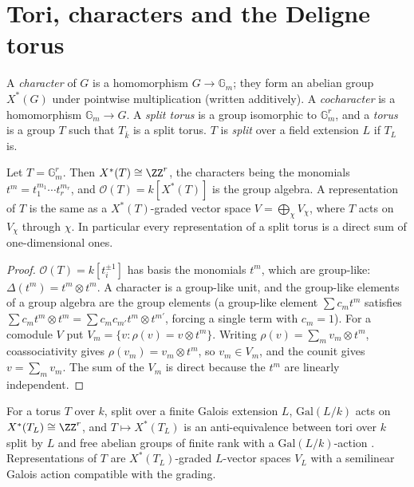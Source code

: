 \section{Tori, characters and the Deligne torus}\label{algebraic-groups:section-tori}

\begin{definition}\label{algebraic-groups:definition-torus}
A \emph{character} of $G$ is a homomorphism $G \to \mathbb{G}_m$; they form an abelian group $X^*(G)$ under pointwise multiplication (written additively). A
\emph{cocharacter} is a homomorphism $\mathbb{G}_m \to G$. A \emph{split torus} is a group isomorphic to $\mathbb{G}_m^r$, and a \emph{torus} is a group $T$ such that $T_{\bar k}$ is a split
torus. $T$ is \emph{split} over a field extension $L$ if $T_L$ is.
\end{definition}

\begin{proposition}\label{algebraic-groups:proposition-torus-reps}
Let $T = \mathbb{G}_m^r$. Then $X^*(T) \cong \ZZ^r$, the characters being the monomials $t^m = t_1^{m_1} \cdots t_r^{m_r}$, and $\mathcal{O}(T) = k[X^*(T)]$ is the group algebra. A
representation of $T$ is the same as a $X^*(T)$-graded vector space $V = \bigoplus_\chi V_\chi$, where $T$ acts on $V_\chi$ through $\chi$. In particular every representation of a
split torus is a direct sum of one-dimensional ones.
\end{proposition}

\begin{proof}
$\mathcal{O}(T) = k[t_i^{\pm 1}]$ has basis the monomials $t^m$, which are group-like: $\Delta(t^m) = t^m \otimes t^m$. A character is a group-like unit, and the group-like elements of a
group algebra are the group elements (a group-like element $\sum c_mt^m$ satisfies $\sum c_mt^m \otimes t^m = \sum c_mc_{m'}t^m \otimes t^{m'}$, forcing a single term with $c_m = 1$). For a
comodule $V$ put $V_m = \{v : \rho(v) = v \otimes t^m\}$. Writing $\rho(v) = \sum_mv_m \otimes t^m$, coassociativity gives $\rho(v_m) = v_m \otimes t^m$, so $v_m \in V_m$, and the counit gives
$v = \sum_mv_m$. The sum of the $V_m$ is direct because the $t^m$ are linearly independent.
\end{proof}

\begin{remark}\label{algebraic-groups:remark-galois-tori}
For a torus $T$ over $k$, split over a finite Galois extension $L$, $\mathrm{Gal}(L/k)$ acts on $X^*(T_L) \cong \ZZ^r$, and $T \mapsto X^*(T_L)$ is an anti-equivalence between tori
over $k$ split by $L$ and free abelian groups of finite rank with a $\mathrm{Gal}(L/k)$-action \cite{milne-algebraic-groups}. Representations of $T$ are
$X^*(T_L)$-graded $L$-vector spaces $V_L$ with a semilinear Galois action compatible with the grading.
\end{remark}

